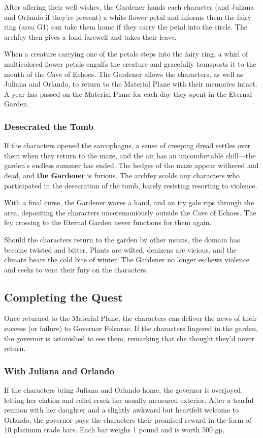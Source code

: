 \documentclass[10pt,a4paper,twoside,bg=print,twocolumn,openany,nodeprecatedcode]{dndbook}
\begin{document}
After offering their well wishes, the Gardener hands each character (and Juliana and Orlando if they're present) a white flower petal and informs them the fairy ring (area G1) can take them home if they carry the petal into the circle. The archfey then gives a fond farewell and takes their leave.

When a creature carrying one of the petals steps into the fairy ring, a whirl of multicolored flower petals engulfs the creature and gracefully transports it to the mouth of the Cave of Echoes. The Gardener allows the characters, as well as Juliana and Orlando, to return to the Material Plane with their memories intact. A year has passed on the Material Plane for each day they spent in the Eternal Garden.

\subsubsection{Desecrated the Tomb}
If the characters opened the sarcophagus, a sense of creeping dread settles over them when they return to the maze, and the air has an uncomfortable chill—the garden's endless summer has ended. The hedges of the maze appear withered and dead, and \textbf{the Gardener} is furious. The archfey scolds any characters who participated in the desecration of the tomb, barely resisting resorting to violence.

With a final curse, the Gardener waves a hand, and an icy gale rips through the area, depositing the characters unceremoniously outside the Cave of Echoes. The fey crossing to the Eternal Garden never functions for them again.

Should the characters return to the garden by other means, the domain has become twisted and bitter. Plants are wilted, denizens are vicious, and the climate bears the cold bite of winter. The Gardener no longer eschews violence and seeks to vent their fury on the characters.

\subsection{Completing the Quest}
Once returned to the Material Plane, the characters can deliver the news of their success (or failure) to Governor Folcarae. If the characters lingered in the garden, the governor is astonished to see them, remarking that she thought they'd never return.

\subsubsection{With Juliana and Orlando}
If the characters bring Juliana and Orlando home, the governor is overjoyed, letting her elation and relief crack her usually measured exterior. After a tearful reunion with her daughter and a slightly awkward but heartfelt welcome to Orlando, the governor pays the characters their promised reward in the form of 10 platinum trade bars. Each bar weighs 1 pound and is worth 500 gp.
\end{document}
